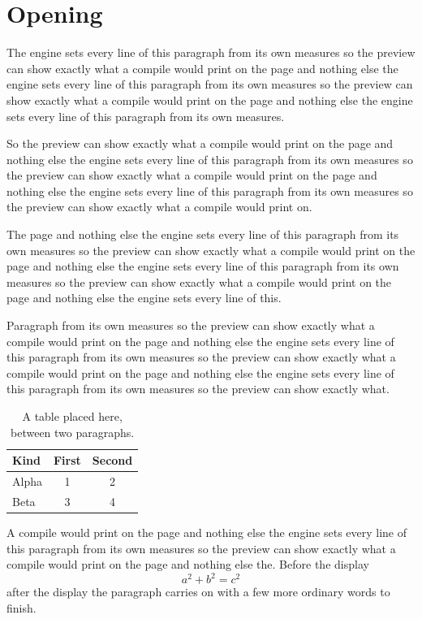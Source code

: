 \documentclass[twoside]{article}
\begin{document}
\section{Opening}

The engine sets every line of this paragraph from its own measures so the preview can show exactly what a compile would print on the page and nothing else the engine sets every line of this paragraph from its own measures so the preview can show exactly what a compile would print on the page and nothing else the engine sets every line of this paragraph from its own measures.

So the preview can show exactly what a compile would print on the page and nothing else the engine sets every line of this paragraph from its own measures so the preview can show exactly what a compile would print on the page and nothing else the engine sets every line of this paragraph from its own measures so the preview can show exactly what a compile would print on.

The page and nothing else the engine sets every line of this paragraph from its own measures so the preview can show exactly what a compile would print on the page and nothing else the engine sets every line of this paragraph from its own measures so the preview can show exactly what a compile would print on the page and nothing else the engine sets every line of this.

Paragraph from its own measures so the preview can show exactly what a compile would print on the page and nothing else the engine sets every line of this paragraph from its own measures so the preview can show exactly what a compile would print on the page and nothing else the engine sets every line of this paragraph from its own measures so the preview can show exactly what.

\begin{table}[h]
\centering
\begin{tabular}{lcc}
\toprule
Kind & First & Second \\
\midrule
Alpha & 1 & 2 \\
Beta & 3 & 4 \\
\bottomrule
\end{tabular}
\caption{A table placed here, between two paragraphs.}
\end{table}

A compile would print on the page and nothing else the engine sets every line of this paragraph from its own measures so the preview can show exactly what a compile would print on the page and nothing else the. Before the display
\[
a^2 + b^2 = c^2
\]
after the display the paragraph carries on with a few more ordinary words to finish.
\end{document}
